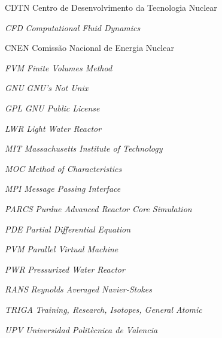 \documentclass[12pt,openright,twoside,a4paper,english,french,spanish,brazil]{abntex2}
\begin{document}
\listoffigures*
\cleardoublepage

\listoftables*
\cleardoublepage








\begin{siglas}
  \item[CDTN] Centro de Desenvolvimento da Tecnologia Nuclear
  \item[\textit{CFD}] \textit{Computational Fluid Dynamics}
  \item[CNEN] Comissão Nacional de Energia Nuclear
  \item[\textit{FVM}] \textit{Finite Volumes Method}
  \item[\textit{GNU}] \textit{GNU's Not Unix}
  \item[\textit{GPL}] \textit{GNU Public License}
  \item[\textit{LWR}] \textit{Light Water Reactor}
  \item[\textit{MIT}] \textit{Massachusetts Institute of Technology}
  \item[\textit{MOC}] \textit{Method of Characteristics}
  \item[\textit{MPI}] \textit{Message Passing Interface}
  \item[\textit{PARCS}] \textit{Purdue Advanced Reactor Core Simulation}
  \item[\textit{PDE}] \textit{Partial Differential Equation}  
  \item[\textit{PVM}] \textit{Parallel Virtual Machine}
  \item[\textit{PWR}] \textit{Pressurized Water Reactor}
  \item[\textit{RANS}] \textit{Reynolds Averaged Navier-Stokes}
  \item[\textit{TRIGA}] \textit{Training, Research, Isotopes, General Atomic}
  \item[\textit{UPV}] \textit{Universidad Politècnica de Valencia}
\end{siglas}
\end{document}
